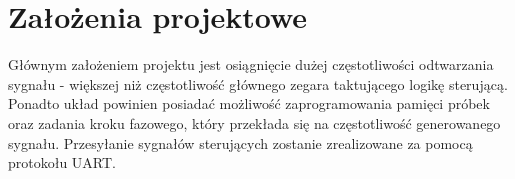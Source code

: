 \section{Założenia projektowe}
    Głównym założeniem projektu jest osiągnięcie dużej częstotliwości odtwarzania sygnału - większej niż 
    częstotliwość głównego zegara taktującego logikę sterującą. Ponadto układ powinien posiadać możliwość 
    zaprogramowania pamięci próbek oraz zadania kroku fazowego, który przekłada się na częstotliwość generowanego sygnału. 
    Przesyłanie sygnałów sterujących zostanie zrealizowane za pomocą protokołu UART. 